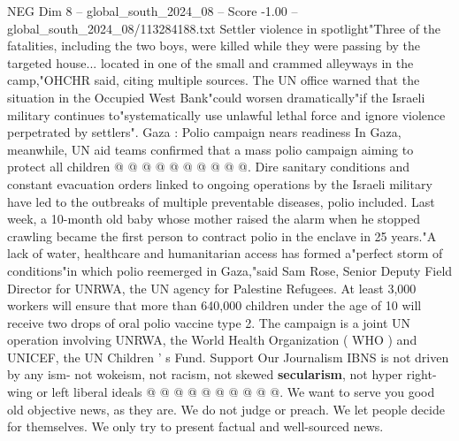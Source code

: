 \begin{textsample}{NEG Dim 8 – global\_south\_2024\_08 – Score -1.00 – global\_south\_2024\_08/113284188.txt}
Settler violence in spotlight"Three of the fatalities, including the two boys, were killed while they were passing by the targeted house... located in one of the small and crammed alleyways in the camp,"OHCHR said, citing multiple sources.
The UN office warned that the situation in the Occupied West Bank"could worsen dramatically"if the Israeli military continues to"systematically use unlawful lethal force and ignore violence perpetrated by settlers".
Gaza : Polio campaign nears readiness In Gaza, meanwhile, UN aid teams confirmed that a mass polio campaign aiming to protect all children @ @ @ @ @ @ @ @ @ @.
Dire sanitary conditions and constant evacuation orders linked to ongoing operations by the Israeli military have led to the outbreaks of multiple preventable diseases, polio included.
Last week, a 10-month old baby whose mother raised the alarm when he stopped crawling became the first person to contract polio in the enclave in 25 years."A lack of water, healthcare and humanitarian access has formed a"perfect storm of conditions"in which polio reemerged in Gaza,"said Sam Rose, Senior Deputy Field Director for UNRWA, the UN agency for Palestine Refugees.
At least 3,000 workers will ensure that more than 640,000 children under the age of 10 will receive two drops of oral polio vaccine type 2.
The campaign is a joint UN operation involving UNRWA, the World Health Organization ( WHO ) and UNICEF, the UN Children ' s Fund.
Support Our Journalism IBNS is not driven by any ism- not wokeism, not racism, not skewed \textbf{secularism}, not hyper right-wing or left liberal ideals @ @ @ @ @ @ @ @ @ @.
We want to serve you good old objective news, as they are.
We do not judge or preach.
We let people decide for themselves.
We only try to present factual and well-sourced news.

\end{textsample}
